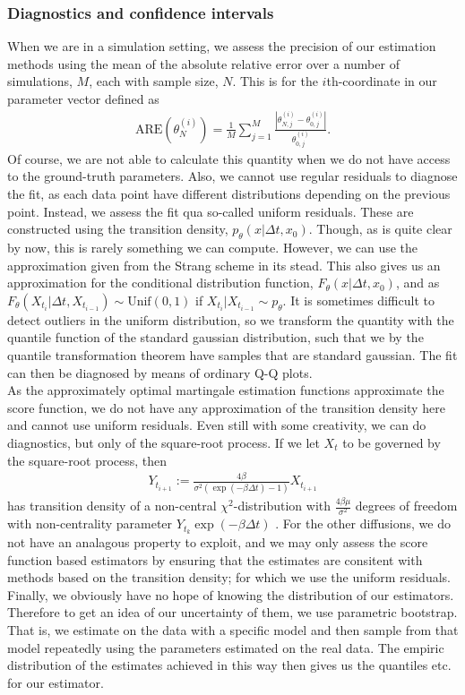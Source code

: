 \subsubsection{Diagnostics and confidence intervals}
When we are in a simulation setting, we assess the precision of our estimation methods using the mean of the absolute relative error over a number of simulations, $M$, each with sample size, $N$. This is for the $i$th-coordinate in our parameter vector defined as
\begin{align}
    \mathrm{ARE}\left(\theta_N^{(i)}\right) = \frac{1}{M}\sum_{j = 1}^M\frac{\left|\theta_{N,j}^{(i)} - \theta_{0,j}^{(i)}\right|}{\theta_{0,j}^{(i)}}.
\end{align}
Of course, we are not able to calculate this quantity when we do not have access to the ground-truth parameters. Also, we cannot use regular residuals to diagnose the fit, as each data point have different distributions depending on the previous point. Instead, we assess the fit qua so-called uniform residuals. These are constructed using the transition density, $p_\theta(x|\Delta t, x_0)$. Though, as is quite clear by now, this is rarely something we can compute. However, we can use the approximation given from the Strang scheme in its stead. This also gives us an approximation for the conditional distribution function, $F_\theta(x|\Delta t, x_0)$, and as $F_\theta(X_{t_{i}}|\Delta t, X_{t_{i - 1}})\sim \mathrm{Unif}(0,1)$ if $X_{t_{i}}|X_{t_{i - 1}} \sim p_\theta$. It is sometimes difficult to detect outliers in the uniform distribution, so we transform the quantity with the quantile function of the standard gaussian distribution, such that we by the quantile transformation theorem have samples that are standard gaussian. The fit can then be diagnosed by means of ordinary Q-Q plots.\\
As the approximately optimal martingale estimation functions approximate the score function, we do not have any approximation of the transition density here and cannot use uniform residuals. Even still with some creativity, we can do diagnostics, but only of the square-root process. If we let $X_t$ to be governed by the square-root process, then
\begin{align}
    Y_{t_{i + 1}} := \frac{4\beta}{\sigma^2\left(\exp\left(-\beta \Delta t\right) - 1\right)}X_{t_{i + 1}}
\end{align}
has transition density of a non-central $\chi^2$-distribution with $\frac{4\beta\mu}{\sigma^2}$ degrees of freedom with non-centrality parameter $Y_{t_k}\exp\left(-\beta \Delta t\right)$ \cite[Equation (5.68)]{Srkk2019}. For the other diffusions, we do not have an analagous property to exploit, and we may only assess the score function based estimators by ensuring that the estimates are consitent with methods based on the transition density; for which we use the uniform residuals. Finally, we obviously have no hope of knowing the distribution of our estimators. Therefore to get an idea of our uncertainty of them, we use parametric bootstrap. That is, we estimate on the data with a specific model and then sample from that model repeatedly using the parameters estimated on the real data. The empiric distribution of the estimates achieved in this way then gives us the quantiles etc. for our estimator.